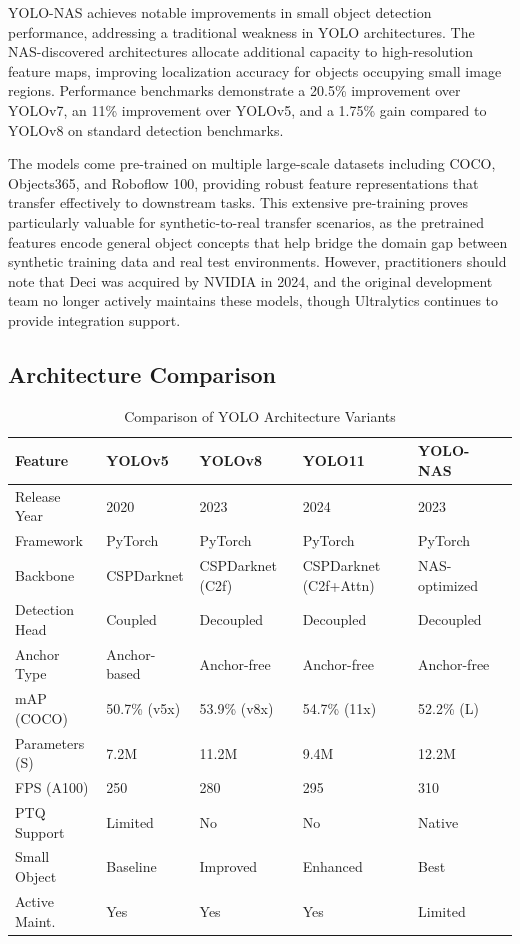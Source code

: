 YOLO-NAS achieves notable improvements in small object detection performance, addressing a traditional weakness in YOLO architectures. The NAS-discovered architectures allocate additional capacity to high-resolution feature maps, improving localization accuracy for objects occupying small image regions. Performance benchmarks demonstrate a 20.5\% improvement over YOLOv7, an 11\% improvement over YOLOv5, and a 1.75\% gain compared to YOLOv8 on standard detection benchmarks.

The models come pre-trained on multiple large-scale datasets including COCO, Objects365, and Roboflow 100, providing robust feature representations that transfer effectively to downstream tasks. This extensive pre-training proves particularly valuable for synthetic-to-real transfer scenarios, as the pretrained features encode general object concepts that help bridge the domain gap between synthetic training data and real test environments. However, practitioners should note that Deci was acquired by NVIDIA in 2024, and the original development team no longer actively maintains these models, though Ultralytics continues to provide integration support.

\subsection{Architecture Comparison}

\begin{table}[htbp]
\centering
\caption{Comparison of YOLO Architecture Variants}
\label{tab:yolo_comparison}
\begin{tabular}{p{2.5cm}p{2cm}p{2cm}p{2cm}p{2cm}p{2cm}}
\toprule
\textbf{Feature} & \textbf{YOLOv5} & \textbf{YOLOv8} & \textbf{YOLO11} & \textbf{YOLO-NAS} \\
\midrule
Release Year & 2020 & 2023 & 2024 & 2023 \\
Framework & PyTorch & PyTorch & PyTorch & PyTorch \\
Backbone & CSPDarknet & CSPDarknet (C2f) & CSPDarknet (C2f+Attn) & NAS-optimized \\
Detection Head & Coupled & Decoupled & Decoupled & Decoupled \\
Anchor Type & Anchor-based & Anchor-free & Anchor-free & Anchor-free \\
mAP (COCO) & 50.7\% (v5x) & 53.9\% (v8x) & 54.7\% (11x) & 52.2\% (L) \\
Parameters (S) & 7.2M & 11.2M & 9.4M & 12.2M \\
FPS (A100) & 250 & 280 & 295 & 310 \\
PTQ Support & Limited & No & No & Native \\
Small Object & Baseline & Improved & Enhanced & Best \\
Active Maint. & Yes & Yes & Yes & Limited \\
\bottomrule
\end{tabular}
\end{table}

